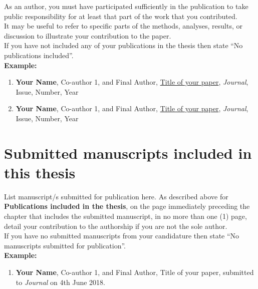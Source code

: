 \begin{instructional}
	\noindent
	As an author, you must have participated sufficiently in the publication to take public responsibility for at least that part of the work that you contributed.\\
    
    \noindent
	It may be useful to refer to specific parts of the methods, analyses, results, or discussion to illustrate your contribution to the paper.\\
    
    \noindent
	If you have not included any of your publications in the thesis then state ``No publications included''.\\
	
	\textbf{Example:}
	\begin{enumerate}

    \item \cite{DumyCitationKey} \textbf{Your Name}, Co-author 1, and Final Author, \href{linktoyourpaper}{Title of your paper}, \textit{Journal}, Issue, Number, Year

    \item \cite{DumyCitationKey} \textbf{Your Name}, Co-author 1, and Final Author, \href{linktoyourpaper}{Title of your paper}, \textit{Journal}, Issue, Number, Year

    \end{enumerate}
	
\end{instructional}





\section*{Submitted manuscripts included in this thesis}

\begin{instructional}
	List manuscript/s submitted for publication here. As described above for \textbf{Publications included in the thesis}, on the page immediately preceding the chapter that includes the submitted manuscript, in no more than one (1) page, detail your contribution to the authorship if you are not the sole author.\\
    
    \noindent
    If you have no submitted manuscripts from your candidature then state ``No manuscripts submitted for publication''.\\
    
    \textbf{Example:}
    \begin{enumerate}

    \item \cite{DumyCitationKey} \textbf{Your Name}, Co-author 1, and Final Author, Title of your paper, submitted to \textit{Journal} on 4th June 2018.

    \end{enumerate}
\end{instructional}

